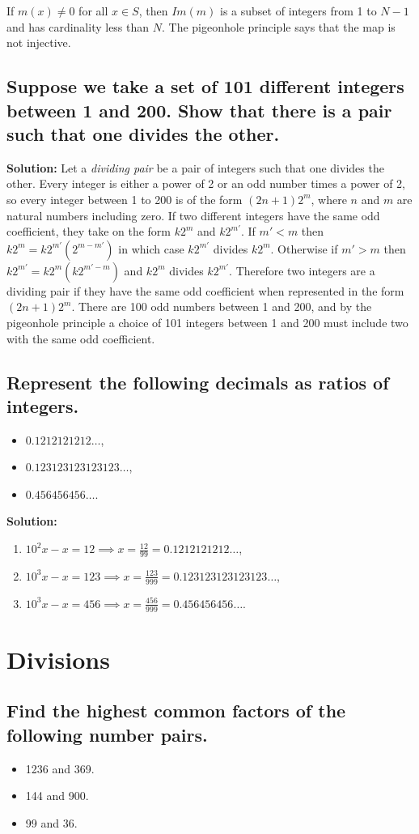 \documentclass{article}
\newcommand{\exercise}[1]{\subsection{\normalfont #1}}
\newcommand{\solution}{\indent\indent \textbf{Solution: }}
\begin{document}
If $m(x) \neq 0$ for all $x\in S$, then $Im(m)$ is a subset of integers from 1 to $N-1$ and has cardinality less than $N$. The pigeonhole principle says that the map is not injective. 

\exercise{Suppose we take a set of 101 different integers between 1 and 200. Show that there is a pair such that one divides the other.}
\solution 
Let a \textit{dividing pair} be a pair of integers such that one divides the other. Every integer is either a power of 2 or an odd number times a power of 2, so every integer between 1 to 200 is of the form $(2n+1)2^m$, where $n$ and $m$ are natural numbers including zero. If two different integers have the same odd coefficient, they take on the form $k2^m$ and $k2^{m'}$. If $m' < m$ then $k2^m = k2^{m'}(2^{m-m'})$ in which case $k2^{m'}$ divides $k2^m$. Otherwise if $m' > m$ then $k2^{m'} = k2^m(k2^{m'-m})$ and $k2^m$ divides $k2^{m'}$. Therefore two integers are a dividing pair if they have the same odd coefficient when represented in the form $(2n+1)2^m$. There are 100 odd numbers between 1 and 200, and by the pigeonhole principle a choice of 101 integers between 1 and 200 must include two with the same odd coefficient. 

\exercise{Represent the following decimals as ratios of integers.}
\begin{itemize} 
\item $0.1212121212\dots$,
\item $0.123123123123123\dots$,
\item $0.456456456\dots$.
\end{itemize}
\solution
\begin{enumerate}
\item $10^2x -x = 12 \implies x = \frac{12}{99} = 0.1212121212\dots$,
\item $10^3x-x = 123 \implies x = \frac{123}{999} = 0.123123123123123\dots$,
\item $10^3x-x = 456 \implies x = \frac{456}{999} = 0.456456456\dots$.
\end{enumerate}

\newpage
\section{Divisions}
\exercise{Find the highest common factors of the following number pairs.}
\begin{itemize}
\item 1236 and 369.
\item 144 and 900.
\item 99 and 36.
\end{itemize}
\end{document}
